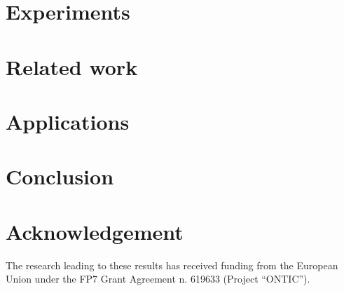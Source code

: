 \documentclass[preprint,review,12pt]{elsarticle}
\begin{document}
%
%
%


\section{Experiments}
\label{Experiments}




\section{Related work}
\label{Related work}



\section{Applications}
\label{Applications}



\section{Conclusion} \label{Conclusion}


\section*{Acknowledgement}
The research leading to these results has received funding from the European
Union under the FP7 Grant Agreement n. 619633 (Project ``ONTIC'').
\\





{}

\end{document}

